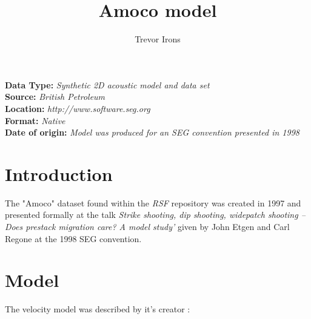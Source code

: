 \title{Amoco model}
\author{Trevor Irons}
\maketitle
\lstset{language=python,numbers=left,numberstyle=\tiny,showstringspaces=false}

\noindent
\textbf {Data Type:} \emph{Synthetic 2D acoustic model and data set}\\
\textbf {Source:} \emph{British Petroleum}\\
\textbf {Location:} \emph{http://www.software.seg.org}\\
\textbf {Format:} \emph{Native} \\
\textbf{Date of origin:} \emph{Model was produced for an SEG convention presented in 1998}\\

\section{Introduction}
The "Amoco" dataset found within the \emph{RSF} repository was created in 1997 and presented formally at the talk \emph{Strike shooting, dip shooting, widepatch shooting -- Does prestack migration care? A model study'} given by John Etgen and Carl Regone at the 1998 SEG convention.

\section{Model}
The velocity model was described by it's creator :


